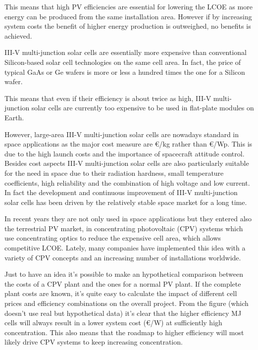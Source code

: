 \documentclass[11pt]{article} %
\begin{document}
 This means that high PV efficiencies  are  essential  for lowering  the  LCOE  as  more  energy can  be produced from the same installation area. However if by increasing system costs the  benefit  of  higher  energy  production is outweighed, no benefits is achieved.   

III-V multi-junction solar  cells  are essentially more expensive than conventional Silicon-based solar cell technologies on the same cell area. In fact, the price of typical GaAs or Ge wafers is more or less a hundred times the one for a Silicon wafer. 

This means that even if their efficiency is about twice as high, III-V multi-junction solar cells are currently too expensive to be used in flat-plate modules on Earth.   

However, large-area III-V multi-junction solar cells are nowadays standard in space applications as the major cost measure are €/kg rather than €/Wp. This is due to the high launch costs and the importance of spacecraft attitude control. Besides cost aspects III-V multi-junction solar cells  are  also  particularly  suitable  for  the  need  in  space  due  to  their  radiation  hardness,  small temperature coefficients, high reliability and the combination of high voltage and low current. In fact the development and continuous improvement of III-V multi-junction solar cells has been driven by the relatively stable space market for a long time.  

 In recent years they are not  only used in space applications but they entered also the terrestrial PV market, in  concentrating  photovoltaic  (CPV)  systems which use  concentrating  optics  to  reduce  the  expensive  cell  area,  which  allows  competitive  LCOE.  Lately, many  companies  have  implemented  this  idea  with  a  variety  of  CPV  concepts  and  an  increasing number of installations worldwide.   

Just to have an idea it’s possible to make an hypothetical comparison between the costs of a CPV plant and the ones for a normal PV plant. If the complete plant costs are known, it’s quite easy to calculate the impact of different cell prices and efficiency combinations on the overall project. From the figure (which doesn’t use real but hypothetical data) it’s clear that the higher efficiency MJ cells will always result in a lower system cost (€/W) at sufficiently high concentration. This also means that the roadmap to higher efficiency will most likely drive CPV systems to keep increasing concentration.   
\end{document}
